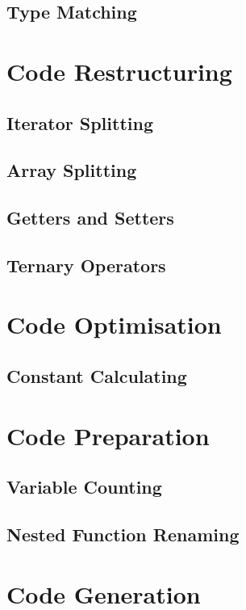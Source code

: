 \documentclass[a4paper,11pt]{report}
\begin{document}
\subsection{Type Matching}

\section{Code Restructuring}
\subsection{Iterator Splitting}
\subsection{Array Splitting}
\subsection{Getters and Setters}
\subsection{Ternary Operators}

\section{Code Optimisation}
\subsection{Constant Calculating}

\section{Code Preparation}
\subsection{Variable Counting}
\subsection{Nested Function Renaming}

\section{Code Generation}
\end{document}
